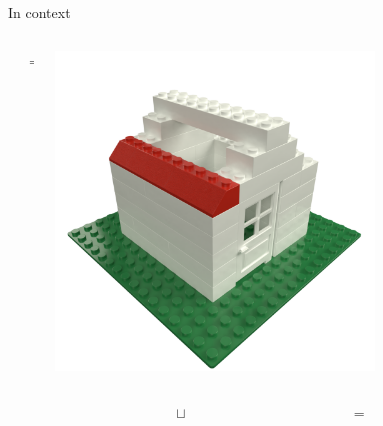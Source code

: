 \begin{frame}{In context}
\begin{columns}[c]
\begin{column}{0.2\textwidth}
        \end{column}\begin{column}{0.05\textwidth}
            \centering
            =
        \end{column}\begin{column}{0.3\textwidth}
            \centering
            \includegraphics[width=0.7\textwidth]{images/03_transformation_framework/lego_house_roof_step.png}
        \end{column}
    \end{columns}
    \begin{columns}[c]
        \begin{column}{0.05\textwidth}
        \end{column}\begin{column}{0.3\textwidth}
            \centering
        \end{column}\begin{column}{0.05\textwidth}
            \centering
            $\sqcup$
        \end{column}\begin{column}{0.2\textwidth}
            \centering
        \end{column}\begin{column}{0.05\textwidth}
            \centering
            =
        \end{column}\begin{column}{0.3\textwidth}
            \centering
        \end{column}
    \end{columns} 

\end{frame}
